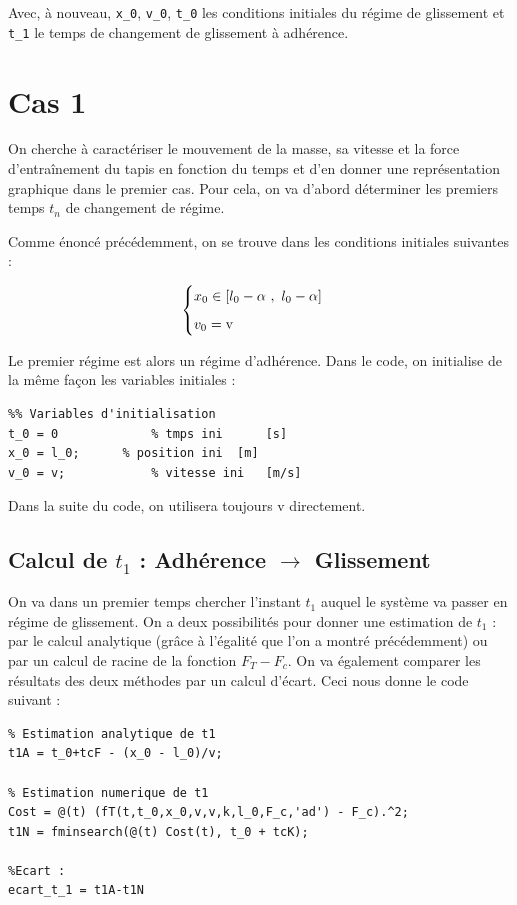 \documentclass{article}
\newcommand{\ts}{\scriptscriptstyle}
\begin{document}
Avec, à nouveau, \verb|x_0|, \verb|v_0|, \verb|t_0| les conditions initiales du régime de glissement et \verb|t_1| le temps de changement de glissement à adhérence.

\newpage
\section{Cas 1}
On cherche à caractériser le mouvement de la masse, sa vitesse et la force d'entraînement du tapis en fonction du temps et d'en donner une représentation graphique dans le premier cas. Pour cela, on va d'abord déterminer les premiers temps $t_n$ de changement de régime.   
  
Comme énoncé précédemment, on se trouve dans les conditions initiales suivantes : 

$$
\begin{cases}
	\vspace{.2cm}
	x_0\in [l_0-\alpha~,~l_0-\alpha]\\
	v_0 = \text{v}
\end{cases}
$$

Le premier régime est alors un régime d'adhérence. Dans le code, on initialise de la même façon les variables initiales : 
\begin{lstlisting}
%% Variables d'initialisation
t_0 = 0 			% tmps ini		[s]
x_0 = l_0; 		% position ini	[m]
v_0 = v;			% vitesse ini	[m/s]       
\end{lstlisting}

Dans la suite du code, on utilisera toujours v directement. 


\subsection{Calcul de $t_1$ : Adhérence $\rightarrow$ Glissement}\label{ssec_3.1}
On va dans un premier temps chercher l'instant $t_1$ auquel le système va passer en régime de glissement. On a deux possibilités pour donner une estimation de $t_1$ : par le calcul analytique (grâce à l'égalité que l'on a montré précédemment) ou par un calcul de racine de la fonction $F_{\ts T}-F_c$. On va également comparer les résultats des deux méthodes par un calcul d'écart. Ceci nous donne le code suivant :

\begin{lstlisting}
% Estimation analytique de t1
t1A = t_0+tcF - (x_0 - l_0)/v;

% Estimation numerique de t1
Cost = @(t) (fT(t,t_0,x_0,v,v,k,l_0,F_c,'ad') - F_c).^2;
t1N = fminsearch(@(t) Cost(t), t_0 + tcK);

%Ecart :
ecart_t_1 = t1A-t1N
\end{lstlisting}
\end{document}
